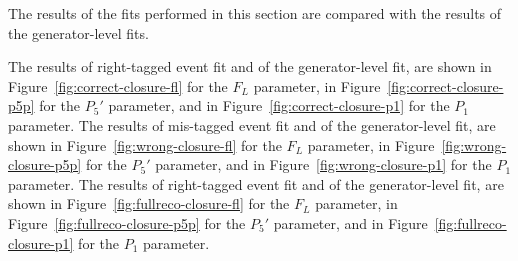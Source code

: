 



The results of the fits performed in this section are compared with the results of the generator-level fits.

The results of right-tagged event fit and of the generator-level fit, are shown in Figure~\ref{fig:correct-closure-fl} for the $F_L$ parameter, in Figure~\ref{fig:correct-closure-p5p} for the $P_5'$ parameter, and in Figure~\ref{fig:correct-closure-p1} for the $P_1$ parameter.
The results of mis-tagged event fit and of the generator-level fit, are shown in Figure~\ref{fig:wrong-closure-fl} for the $F_L$ parameter, in Figure~\ref{fig:wrong-closure-p5p} for the $P_5'$ parameter, and in Figure~\ref{fig:wrong-closure-p1} for the $P_1$ parameter.
The results of right-tagged event fit and of the generator-level fit, are shown in Figure~\ref{fig:fullreco-closure-fl} for the $F_L$ parameter, in Figure~\ref{fig:fullreco-closure-p5p} for the $P_5'$ parameter, and in Figure~\ref{fig:fullreco-closure-p1} for the $P_1$ parameter.

